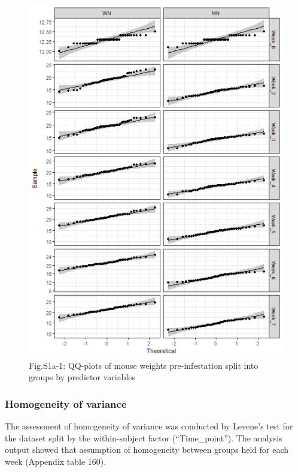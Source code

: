 \documentclass[
  12pt,
  letterpaper,
]{article}
\begin{document}
\begin{figure}[H]

{\centering \includegraphics[width=0.95\linewidth,]{Statistics_Report_files/figure-latex/qq-plot-figure-S1a-1} 

}

\caption{Fig.S1a-1: QQ-plots of mouse weights pre-infestation split into groups by predictor variables}\label{fig:qq-plot-figure-S1a}
\end{figure}

\subsubsection{Homogeneity of variance}\label{homogeneity-of-variance-6}

The assessment of homogeneity of variance was conducted by Levene's test for the dataset split by the within-subject factor (``Time\_point''). The analysis output showed that assumption of homogeneity between groups held for each week (Appendix table 160).
\end{document}
